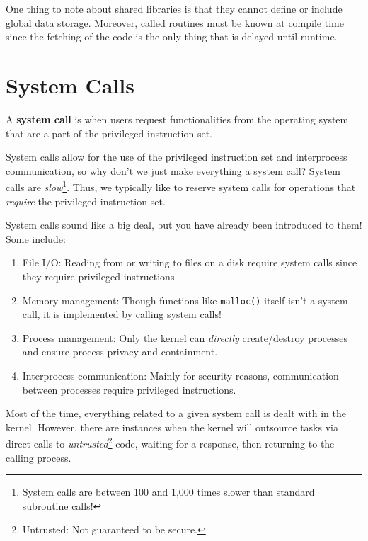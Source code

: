 \documentclass{report}
\begin{document}
One thing to note about shared libraries is that they cannot define or include global data
storage. Moreover, called routines must be known at compile time since the fetching of the code is
the only thing that is delayed until runtime. 





\section{System Calls}
\begin{tcolorbox}[title=Definition: System Call]
  A \textbf{system call} is when users request functionalities from the operating system that are a
  part of the privileged instruction set.
\end{tcolorbox}

System calls allow for the use of the privileged instruction set and interprocess communication, so
why don't we just make everything a system call? System calls are \textit{slow}\footnote{System
  calls are between 100 and 1,000 times slower than standard subroutine calls!}. Thus, we typically
like to reserve system calls for operations that \textit{require} the privileged instruction set.

\begin{tcolorbox}[colback=blue!5!white,colframe=black!75!blue,title=Example: System Call Stress] 
  System calls sound like a big deal, but you have already been introduced to them! Some include:
  \begin{enumerate}[label=\textit{(\roman*)}]
  \item File I/O: Reading from or writing to files on a disk require system calls since they require
    privileged instructions.
  \item Memory management: Though functions like \texttt{malloc()} itself isn't a system call, it is
    implemented by calling system calls!
  \item Process management: Only the kernel can \textit{directly} create/destroy processes and
    ensure process privacy and containment.
  \item Interprocess communication: Mainly for security reasons, communication between processes
    require privileged instructions.
  \end{enumerate}
\end{tcolorbox}

Most of the time, everything related to a given system call is dealt with in the kernel. However,
there are instances when the kernel will outsource tasks via direct calls to
\textit{untrusted}\footnote{Untrusted: Not guaranteed to be secure.}
code, waiting for a response, then returning to the calling process. 
\end{document}
